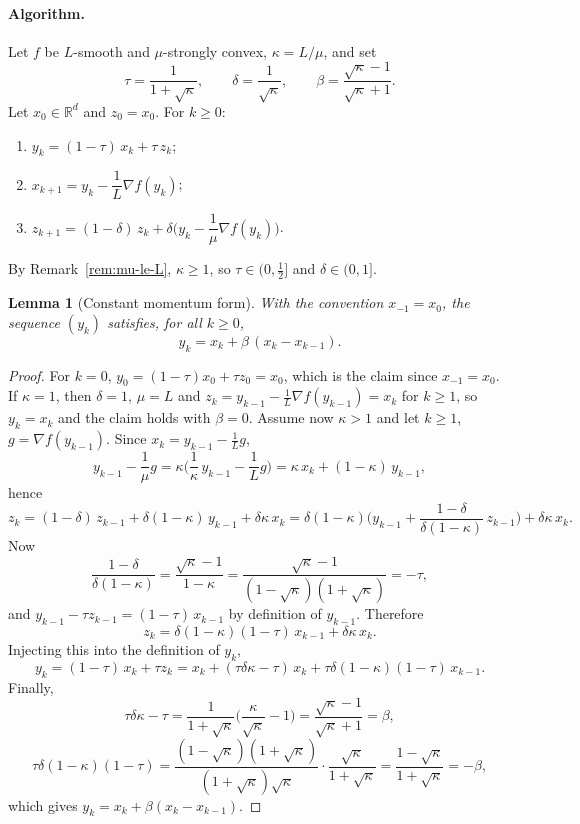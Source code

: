 \documentclass[11pt,a4paper]{article}
\newtheorem{lemma}{Lemma}
\theoremstyle{definition}
\theoremstyle{remark}
\newcommand{\R}{\mathbb{R}}
\begin{document}
\paragraph{Algorithm.}
Let $f$ be $L$-smooth and $\mu$-strongly convex, $\kappa = L/\mu$, and set
\[
\tau = \frac{1}{1+\sqrt\kappa}, \qquad \delta = \frac{1}{\sqrt\kappa}, \qquad \beta = \frac{\sqrt\kappa - 1}{\sqrt\kappa + 1}.
\]
Let $x_0 \in \R^d$ and $z_0 = x_0$. For $k \ge 0$:
\begin{enumerate}
\item $y_k = (1-\tau)\,x_k + \tau\, z_k$;
\item $x_{k+1} = y_k - \dfrac1L \nabla f(y_k)$;
\item $z_{k+1} = (1-\delta)\,z_k + \delta\Big(y_k - \dfrac1\mu \nabla f(y_k)\Big)$.
\end{enumerate}
By Remark~\ref{rem:mu-le-L}, $\kappa \ge 1$, so $\tau \in (0, \frac12]$ and $\delta \in (0,1]$.

\begin{lemma}[Constant momentum form]\label{lem:momentum}
With the convention $x_{-1} = x_0$, the sequence $(y_k)$ satisfies, for all $k \ge 0$,
\[
y_k = x_k + \beta\,(x_k - x_{k-1}).
\]
\end{lemma}

\begin{proof}
For $k = 0$, $y_0 = (1-\tau)x_0 + \tau z_0 = x_0$, which is the claim since $x_{-1} = x_0$. If $\kappa = 1$, then $\delta = 1$, $\mu = L$ and $z_{k} = y_{k-1} - \frac1L \nabla f(y_{k-1}) = x_k$ for $k \ge 1$, so $y_k = x_k$ and the claim holds with $\beta = 0$. Assume now $\kappa > 1$ and let $k \ge 1$, $g = \nabla f(y_{k-1})$. Since $x_k = y_{k-1} - \frac1L g$,
\[
y_{k-1} - \frac1\mu g = \kappa\Big(\frac1\kappa\, y_{k-1} - \frac1L g\Big) = \kappa\, x_k + (1-\kappa)\, y_{k-1},
\]
hence
\[
z_k = (1-\delta)\,z_{k-1} + \delta(1-\kappa)\, y_{k-1} + \delta\kappa\, x_k
= \delta(1-\kappa)\Big(y_{k-1} + \frac{1-\delta}{\delta(1-\kappa)}\, z_{k-1}\Big) + \delta\kappa\, x_k .
\]
Now
\[
\frac{1-\delta}{\delta(1-\kappa)} = \frac{\sqrt\kappa - 1}{1-\kappa} = \frac{\sqrt\kappa - 1}{(1-\sqrt\kappa)(1+\sqrt\kappa)} = -\tau ,
\]
and $y_{k-1} - \tau z_{k-1} = (1-\tau)\,x_{k-1}$ by definition of $y_{k-1}$. Therefore
\[
z_k = \delta(1-\kappa)(1-\tau)\, x_{k-1} + \delta\kappa\, x_k .
\]
Injecting this into the definition of $y_k$,
\[
y_k = (1-\tau)\,x_k + \tau z_k = x_k + (\tau\delta\kappa - \tau)\, x_k + \tau\delta(1-\kappa)(1-\tau)\, x_{k-1}.
\]
Finally,
\[
\tau\delta\kappa - \tau = \frac{1}{1+\sqrt\kappa}\Big(\frac{\kappa}{\sqrt\kappa} - 1\Big) = \frac{\sqrt\kappa - 1}{\sqrt\kappa + 1} = \beta,
\]
\[
\tau\delta(1-\kappa)(1-\tau) = \frac{(1-\sqrt\kappa)(1+\sqrt\kappa)}{(1+\sqrt\kappa)\sqrt\kappa}\cdot\frac{\sqrt\kappa}{1+\sqrt\kappa} = \frac{1-\sqrt\kappa}{1+\sqrt\kappa} = -\beta,
\]
which gives $y_k = x_k + \beta(x_k - x_{k-1})$.
\end{proof}
\end{document}
